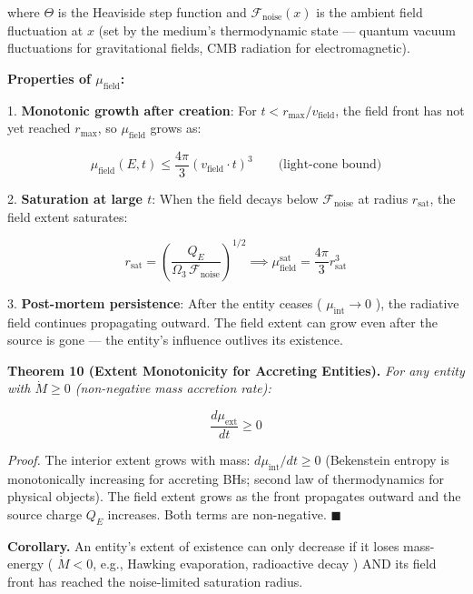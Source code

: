 \documentclass[11pt,a4paper]{article}
\theoremstyle{definition}
\theoremstyle{remark}
\begin{document}
where $\Theta$ is the Heaviside step function and $\mathcal{F}_{\text{noise}}(x)$ is the ambient field fluctuation at $x$ (set by the medium's thermodynamic state — quantum vacuum fluctuations for gravitational fields, CMB radiation for electromagnetic).

\textbf{Properties of $\mu_{\text{field}}$:}

1. \textbf{Monotonic growth after creation}: For $t < r_{\text{max}} / v_{\text{field}}$, the field front has not yet reached $r_{\text{max}}$, so $\mu_{\text{field}}$ grows as:


\begin{equation}
\mu_{\text{field}}(E, t) \leq \frac{4\pi}{3}(v_{\text{field}} \cdot t)^3 \qquad \text{(light-cone bound)}
\end{equation}


2. \textbf{Saturation at large $t$}: When the field decays below $\mathcal{F}_{\text{noise}}$ at radius $r_{\text{sat}}$, the field extent saturates:


\begin{equation}
r_{\text{sat}} = \left( \frac{Q_E}{\Omega_3 \, \mathcal{F}_{\text{noise}}} \right)^{1/2} \implies \mu_{\text{field}}^{\text{sat}} = \frac{4\pi}{3} r_{\text{sat}}^3
\end{equation}


3. \textbf{Post-mortem persistence}: After the entity ceases ( $\mu_{\text{int}} \to 0$ ), the radiative field continues propagating outward. The field extent can grow even after the source is gone — the entity's influence outlives its existence.

\textbf{Theorem 10 (Extent Monotonicity for Accreting Entities).} \textit{For any entity with $\dot{M} \geq 0$ (non-negative mass accretion rate):}


\begin{equation}
\frac{d\mu_{\text{ext}}}{dt} \geq 0
\end{equation}


\textit{Proof.} The interior extent grows with mass: $d\mu_{\text{int}}/dt \geq 0$ (Bekenstein entropy is monotonically increasing for accreting BHs; second law of thermodynamics for physical objects). The field extent grows as the front propagates outward and the source charge $Q_E$ increases. Both terms are non-negative. $\blacksquare$

\textbf{Corollary.} An entity's extent of existence can only decrease if it loses mass-energy ( $\dot{M} < 0$, e.g., Hawking evaporation, radioactive decay ) AND its field front has reached the noise-limited saturation radius.
\end{document}
